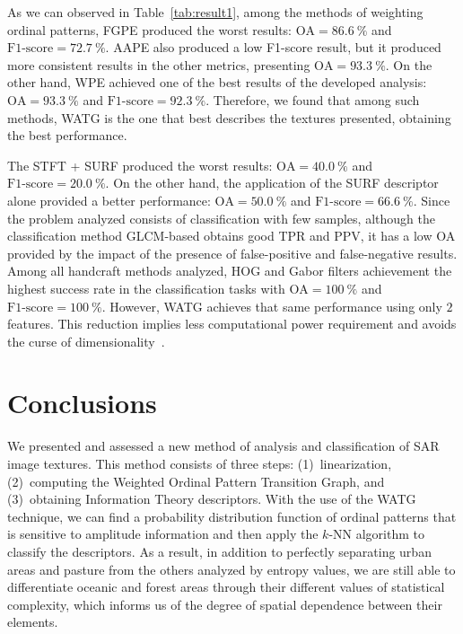 \documentclass[journal]{IEEEtran}
\begin{document}
	As we can observed in Table~\ref{tab:result1}, among the methods of weighting ordinal patterns, FGPE produced the worst results: $\text{OA}=\SI{86.6}{\percent}$ and $\text{F1-score}=\SI{72.7}{\percent}$.
	AAPE also produced a low F1-score result, but it produced more consistent results in the other metrics, presenting $\text{OA} = \SI{93.3}{\percent}$.
	On the other hand, WPE achieved one of the best results of the developed analysis: $\text{OA}=\SI{93.3}{\percent}$ and $\text{F1-score}=\SI{92.3}{\percent}$.
	Therefore, we found that among such methods, WATG is the one that best describes the textures presented, obtaining the best performance.
	
	
	The STFT + SURF produced the worst results: $\text{OA}=\SI{40.0}{\percent}$ and $\text{F1-score}=\SI{20.0}{\percent}$.
	On the other hand, the application of the SURF descriptor alone provided a better performance:  $\text{OA}=\SI{50.0}{\percent}$ and $\text{F1-score}=\SI{66.6}{\percent}$.
	Since the problem analyzed consists of classification with few samples, although the classification method GLCM-based obtains good TPR and PPV, it has a low OA provided by the impact of the presence of false-positive and false-negative results.
	Among all handcraft methods analyzed, HOG and Gabor filters achievement the highest success rate in the classification tasks with $\text{OA} = \SI{100}{\percent}$ and $\text{F1-score} = \SI{100}{\percent}$.
	However, WATG achieves that same performance using only $2$ features.
	This reduction implies less computational power requirement and avoids the curse of dimensionality~\cite{TheCursesofDimensionality2018}.
	
	\section{Conclusions}\label{Conclusion}
	
	We presented and assessed a new method of analysis and classification of SAR image textures.
	This method consists of three steps: 
	(1)~linearization, 
	(2)~computing the Weighted Ordinal Pattern Transition Graph, and 
	(3)~obtaining Information Theory descriptors.	
	With the use of the WATG technique, we can find a probability distribution function of ordinal patterns that is sensitive to amplitude information and then apply the $k$-NN algorithm to classify the descriptors.
	As a result, in addition to perfectly separating urban areas and pasture from the others analyzed by entropy values, we are still able to differentiate oceanic and forest areas through their different values of statistical complexity, which informs us of the degree of spatial dependence between their elements.
	
\end{document}
